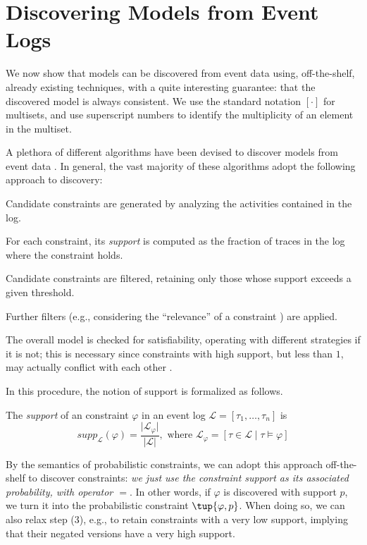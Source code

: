 \section{Discovering \pdeclare Models from Event Logs}
\label{sec:discovery}
We now show that \pdeclare models can be discovered from event data using, off-the-shelf, already existing techniques, with a quite interesting guarantee: that the discovered model is always consistent.
%
We use the standard notation $[\cdot]$ for multisets, and use superscript numbers to identify the multiplicity of an element in the multiset.

A plethora of different algorithms have been devised to discover \declare models from event data \cite{LMMR07,MaCV12,CiccioM15,DBLP:conf/caise/SchonigRCJM16}. In general, the vast majority of these algorithms adopt the following approach to discovery:
\begin{inparaenum}[(1)] 
\item  Candidate constraints are generated by analyzing the activities contained in the log. 
\item For each constraint, its \emph{support} is computed as the fraction of traces in the log where the constraint holds.
\item Candidate constraints are filtered, retaining only those whose support exceeds a given threshold. 
\item Further filters (e.g., considering the ``relevance'' of a constraint \cite{DMMM18}) are applied. 
\item The overall model is checked for satisfiability, operating with different strategies if it is not; this is necessary since constraints with high support, but less than $1$, may actually conflict with each other \cite{DMMM17}.
\end{inparaenum}
%
In this procedure, the notion of support is formalized as follows.
\begin{definition}
The \emph{support} of an \LTLf constraint $\varphi$ in an event log $\mathcal{L} = [\tau_1, \dots,  \tau_n]$ is
\begin{equation*}
\mathit{supp}_{\mathcal{L}}(\varphi) = \frac{\vert\mathcal{L}_{\varphi}\vert}{\vert \mathcal{L}\vert}, \text{ where }\mathcal{L}_{\varphi} = [\tau \in \mathcal{L} \mid \tau \models \varphi]
\end{equation*}
\end{definition}
%
By the semantics of probabilistic constraints, we can adopt this approach off-the-shelf to discover \pdeclare constraints: \emph{we just use the constraint support as its associated probability, with operator $=$}. In other words, if $\varphi$ is discovered with support $p$, we turn it into the probabilistic constraint $\tup{\varphi,p}$. When doing so, we can also relax step (3), e.g., to retain constraints with a very low support, implying that their negated versions have a very high support.


